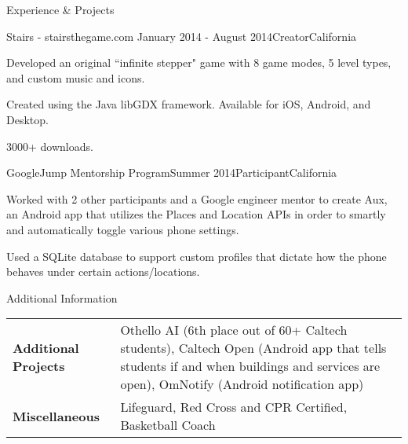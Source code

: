 \documentclass{resume} %
\begin{document}
\begin{rSection}{Experience \& Projects}

\begin{rSubsection}{Stairs - stairsthegame.com }{January 2014 - August 2014}{Creator}{California}
\item Developed an original ``infinite stepper" game with 8 game modes,
    5 level types, and custom music and icons.
\item Created using the Java libGDX framework. Available for iOS, Android, and Desktop.
\item 3000+ downloads.
\end{rSubsection}


\begin{rSubsection}{GoogleJump Mentorship Program}{Summer 2014}{Participant}{California}
\item Worked with 2 other participants and a Google engineer mentor to create Aux,
    an Android app that utilizes the Places and Location APIs in order to smartly
    and automatically toggle various phone settings.
\item Used a SQLite database to support custom profiles that dictate how the phone behaves
    under certain actions/locations.
\end{rSubsection}

\end{rSection}




\begin{rSection}{Additional Information}

\noindent\begin{tabularx}{.98\textwidth}{@{}lX}
    \bfseries{Additional Projects}   &  Othello AI (6th place out of 60+ Caltech
    students), Caltech Open (Android app that tells students if and when
    buildings and services are open), OmNotify (Android notification app) \\
    \bfseries{Miscellaneous}   &  Lifeguard, Red Cross and CPR Certified, Basketball
    Coach \\
\end{tabularx}

\end{rSection}
\end{document}
